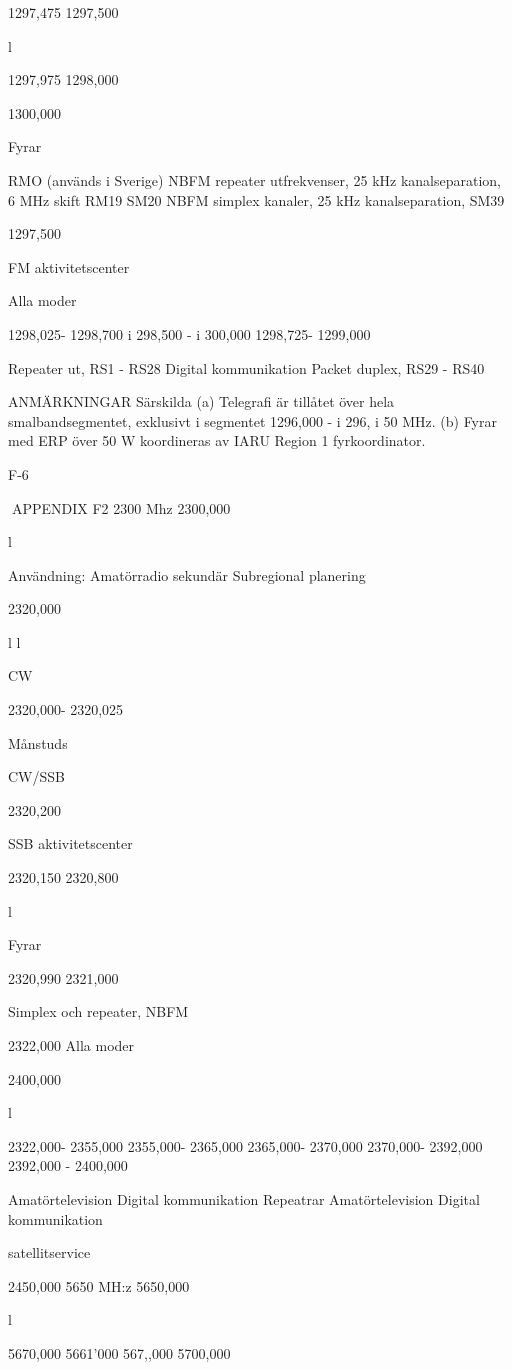 1297,475
1297,500

l

1297,975
1298,000

1300,000

Fyrar

RMO
(används i Sverige)
NBFM repeater utfrekvenser,
25 kHz kanalseparation, 6 MHz skift
RM19
SM20
NBFM simplex kanaler,
25 kHz kanalseparation,
SM39

1297,500

FM aktivitetscenter

Alla moder

1298,025- 1298,700
i 298,500 - i 300,000
1298,725- 1299,000

Repeater ut, RS1 - RS28
Digital kommunikation
Packet duplex, RS29 - RS40

ANMÄRKNINGAR
Särskilda
(a) Telegrafi är tillåtet över hela smalbandsegmentet, exklusivt i segmentet 1296,000 - i 296, i 50 MHz.
(b) Fyrar med ERP över 50 W koordineras av IARU Region 1 fyrkoordinator.

F-6

APPENDIX F2
2300 Mhz
2300,000

l

Användning: Amatörradio sekundär
Subregional planering

2320,000

l
l

CW

2320,000- 2320,025

Månstuds

CW/SSB

2320,200

SSB aktivitetscenter

2320,150
2320,800

l

Fyrar

2320,990
2321,000

Simplex och repeater, NBFM

2322,000
Alla moder

2400,000

l

2322,000- 2355,000
2355,000- 2365,000
2365,000- 2370,000
2370,000- 2392,000
2392,000 - 2400,000

Amatörtelevision
Digital kommunikation
Repeatrar
Amatörtelevision
Digital kommunikation

satellitservice

2450,000
5650 MH:z
5650,000

l

5670,000
5661'000
567,,000
5700,000

